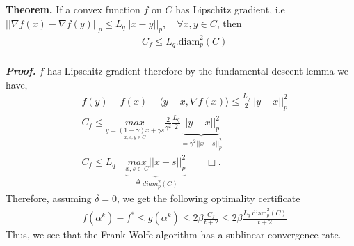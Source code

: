 \documentclass{article}
\begin{document}
\textbf{Theorem.} If a convex function $f$ on $C$ has Lipschitz gradient, i.e $||\nabla f(x)- \nabla f(y)||_{p}\leq L_{q}||x- y||_{p},\quad\forall x,y\in C$, then
\begin{equation*}
\begin{aligned}
      &C_{f}\leq L_{q}.\text{diam}_{p}^{2}(C)
\end{aligned}
\end{equation*}
\\
\textbf{\textit{Proof.}} $f$ has Lipschitz gradient therefore by the fundamental descent lemma we have,
\begin{equation*}
\begin{aligned}
      &f(y)- f(x)- \langle y- x, \nabla f(x)\rangle \leq \frac{L_{q}}{2}||y- x||_{p}^{2}\\
      &C_{f} \leq \underset{\underset{x,s,y\in C}{y=(1-\gamma)x+\gamma s}}{max}\frac{2}{\gamma^{2}}\frac{L_{q}}{2}\underbrace{||y- x||_{p}^{2}}_{=\gamma^{2}||x- s||_{p}^{2}}\\
      &C_{f} \leq L_{q}\quad\underbrace{\underset{x,s\in C}{max}||x- s||_{p}^{2}}_{\overset{\Delta}{=}\textit{diam}_{p}^{2}(C)}\quad\quad\Box.
\end{aligned}    
\end{equation*}
Therefore, assuming $\delta=0$, we get the following optimality certificate
\begin{equation*}
\begin{aligned}
      &f(\alpha^{k})- f^{*}\leq  g(\alpha^{k})\leq 2\beta\frac{C_{f}}{t+2}\leq 2\beta\frac{L_{q}.\text{diam}_{p}^{2}(C)}{t+2}
\end{aligned}    
\end{equation*}
Thus, we see that the Frank-Wolfe algorithm has a sublinear convergence rate.
\end{document}

